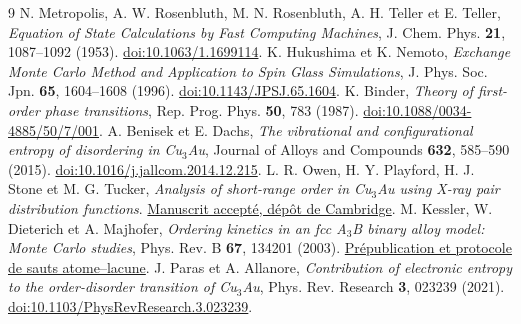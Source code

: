 \documentclass[10pt,a4paper]{article}
\begin{document}
\endgroup
\begin{thebibliography}{9}
 N. Metropolis, A. W. Rosenbluth, M. N. Rosenbluth,
A. H. Teller et E. Teller, \emph{Equation of State Calculations by Fast
Computing Machines}, J. Chem. Phys. \textbf{21}, 1087--1092 (1953).
\href{https://doi.org/10.1063/1.1699114}{doi:10.1063/1.1699114}.
 K. Hukushima et K. Nemoto, \emph{Exchange Monte Carlo
Method and Application to Spin Glass Simulations}, J. Phys. Soc. Jpn.
\textbf{65}, 1604--1608 (1996).
\href{https://doi.org/10.1143/JPSJ.65.1604}{doi:10.1143/JPSJ.65.1604}.
 K. Binder, \emph{Theory of first-order phase transitions},
Rep. Prog. Phys. \textbf{50}, 783 (1987).
\href{https://doi.org/10.1088/0034-4885/50/7/001}{doi:10.1088/0034-4885/50/7/001}.
 A. Benisek et E. Dachs, \emph{The vibrational and configurational
entropy of disordering in Cu$_3$Au}, Journal of Alloys and Compounds
\textbf{632}, 585--590 (2015).
\href{https://doi.org/10.1016/j.jallcom.2014.12.215}{doi:10.1016/j.jallcom.2014.12.215}.
 L. R. Owen, H. Y. Playford, H. J. Stone et M. G. Tucker,
\emph{Analysis of short-range order in Cu$_3$Au using X-ray pair distribution functions}.
\href{https://doi.org/10.17863/CAM.38392}{Manuscrit accepté, dépôt de Cambridge}.
 M. Kessler, W. Dieterich et A. Majhofer,
\emph{Ordering kinetics in an fcc A$_3$B binary alloy model: Monte Carlo studies},
Phys. Rev. B \textbf{67}, 134201 (2003).
\href{https://arxiv.org/abs/cond-mat/0207611}{Prépublication et protocole de sauts atome--lacune}.
 J. Paras et A. Allanore, \emph{Contribution of electronic
entropy to the order-disorder transition of Cu$_3$Au}, Phys. Rev. Research
\textbf{3}, 023239 (2021).
\href{https://doi.org/10.1103/PhysRevResearch.3.023239}{doi:10.1103/PhysRevResearch.3.023239}.
\end{thebibliography}
\end{document}
